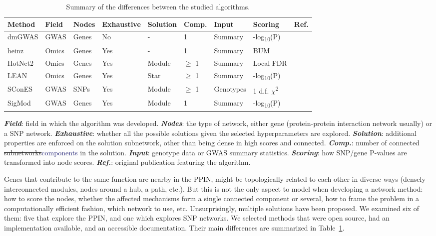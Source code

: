 \documentclass[twocolumn, 11pt]{article}
\newcommand{\caz}[2]{{\sout{#1}}\unskip\space\textcolor{MidnightBlue}{#2}}
\begin{document}
\begin{table}[htbp]
  \caption{\label{tab:method_comparison} Summary of the differences between the studied algorithms.}
  \centering
  \begin{threeparttable}
    \begin{tabular}{l|llllllll}
      Method & Field & Nodes & Exhaustive & Solution & Comp. & Input & Scoring & Ref.\\
      \hline
      dmGWAS & GWAS & Genes & No & - & 1 & Summary & -log\textsubscript{10}(P) & \cite{jia_dmgwas:_2011}\\
      heinz & Omics & Genes & Yes & - & 1 & Summary & BUM & \cite{dittrich_identifying_2008}\\
      HotNet2 & Omics & Genes & Yes & Module & \(\ge\) 1 & Summary & Local FDR & \cite{leiserson_pan-cancer_2015}\\
      LEAN & Omics & Genes & Yes & Star & \(\ge\) 1 & Summary & -log\textsubscript{10}(P) & \cite{gwinner_network-based_2016}\\
      SConES & GWAS & SNPs & Yes & Module & \(\ge\) 1 & Genotypes & 1 d.f. \(\chi\)\textsuperscript{2} & \cite{azencott_efficient_2013}\\
      SigMod & GWAS & Genes & Yes & Module & 1 & Summary & -log\textsubscript{10}(P) & \cite{liu_sigmod:_2017}\\
    \end{tabular}
    \begin{tablenotes}
      \footnotesize{
        \item \textbf{\emph{Field}}: field in which the algorithm was developed. \textbf{\emph{Nodes}}: the type of network, either gene (protein-protein interaction network usually) or a SNP network. \textbf{\emph{Exhaustive}}: whether all the possible solutions given the selected hyperparameters are explored. \textbf{\emph{Solution}}: additional properties are enforced on the solution subnetwork, other than being dense in high scores and connected. \textbf{\emph{Comp.}}: number of connected \caz{subnetworks}{components} in the solution. \textbf{\emph{Input}}: genotype data or GWAS summary statistics. \textbf{\emph{Scoring}}: how SNP/gene P-values are transformed into node scores. \textbf{\emph{Ref.}}: original publication featuring the algorithm.
      }
    \end{tablenotes}
  \end{threeparttable}
\end{table}

Genes that contribute to the same function are nearby in the PPIN, might be topologically related to each other in diverse ways (densely interconnected modules, nodes around a hub, a path, etc.). But this is not the only aspect to model when developing a network method: how to score the nodes, whether the affected mechanisms form a single connected component or several, how to frame the problem in a computationally efficient fashion, which network to use, etc. Unsurprisingly, multiple solutions have been proposed. We examined six of them: five that explore the PPIN, and one which explores SNP networks. We selected methods that were open source, had an implementation available, and an accessible documentation. Their main differences are summarized in Table~\ref{tab:method_comparison}.
\end{document}

